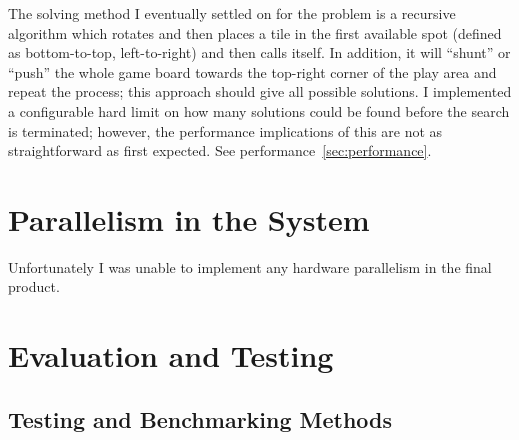 \documentclass[11pt]{article}
\begin{document}
The solving method I eventually settled on for the problem is a recursive algorithm which rotates and then places a tile in the first available spot (defined as bottom-to-top, left-to-right) and then calls itself.
In addition, it will ``shunt'' or ``push'' the whole game board towards the top-right corner of the play area and repeat the process; this approach should give all possible solutions.
I implemented a configurable hard limit on how many solutions could be found before the search is terminated; however, the performance implications of this are not as straightforward as first expected.
See performance~\ref{sec:performance}.

\newpage
\section{Parallelism in the System}


Unfortunately I was unable to implement any hardware parallelism in the final product.

\newpage
\section{Evaluation and Testing}

\subsection{Testing and Benchmarking Methods}\label{sec:testing_benchmarking}

\end{document}
